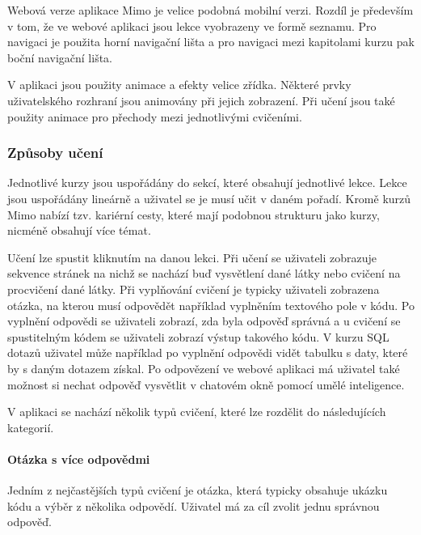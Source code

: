 Webová verze aplikace Mimo je velice podobná mobilní verzi. Rozdíl je především v tom, že ve webové aplikaci jsou lekce vyobrazeny ve formě seznamu. Pro navigaci je použita horní navigační lišta a pro navigaci mezi kapitolami kurzu pak boční navigační lišta.

V aplikaci jsou použity animace a efekty velice zřídka. Některé prvky uživatelského rozhraní jsou animovány při jejich zobrazení. Při učení jsou také použity animace pro přechody mezi jednotlivými cvičeními. 

\subsubsection{Způsoby učení}

Jednotlivé kurzy jsou uspořádány do sekcí, které obsahují jednotlivé lekce. Lekce jsou uspořádány lineárně a uživatel se je musí učit v daném pořadí. Kromě kurzů Mimo nabízí tzv. kariérní cesty, které mají podobnou strukturu jako kurzy, nicméně obsahují více témat.

Učení lze spustit kliknutím na danou lekci. Při učení se uživateli zobrazuje sekvence stránek na nichž se nachází buď vysvětlení dané látky nebo cvičení na procvičení dané látky. Při vyplňování cvičení je typicky uživateli zobrazena otázka, na kterou musí odpovědět například vyplněním textového pole v kódu. Po vyplnění odpovědi se uživateli zobrazí, zda byla odpověď správná a u cvičení se spustitelným kódem se uživateli zobrazí výstup takového kódu. V kurzu SQL dotazů uživatel může například po vyplnění odpovědi vidět tabulku s daty, které by s daným dotazem získal. Po odpovězení ve webové aplikaci má uživatel také možnost si nechat odpověď vysvětlit v chatovém okně pomocí umělé inteligence.

V aplikaci se nachází několik typů cvičení, které lze rozdělit do následujících kategorií.

\paragraph{Otázka s více odpovědmi} Jedním z nejčastějších typů cvičení je otázka, která typicky obsahuje ukázku kódu a výběr z několika odpovědí. Uživatel má za cíl zvolit jednu správnou odpověď.

